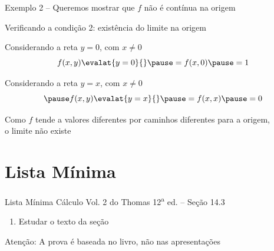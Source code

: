 \documentclass[fleqn,utf8,aspectratio=169,12pt,ignorenonframetext]{beamer}
\begin{document}
\begin{frame}{Exemplo \theexemplo}
  2 -- Queremos mostrar que $f$ não é contínua na origem

  \pause
  Verificando a condição 2: existência do limite na origem

  \pause
  Considerando a reta $y=0$, com $x\neq 0$
  \pause
  \[
    f(x, y)\evalat{y=0}{}
    \pause
    = f(x, 0)
    \pause
    = 1
  \]

  \pause
  Considerando a reta $y=x$, com $x\neq 0$
  \[
    \pause
    f(x, y)\evalat{y=x}{}
    \pause
    = f(x, x)
    \pause
    = 0
  \]

  \pause
  Como $f$ tende a valores diferentes por
  caminhos diferentes para a origem,\\
  o limite não existe
\end{frame}


\section{Lista Mínima}

\begin{frame}{Lista Mínima}
  Cálculo Vol. 2 do Thomas 12\textsuperscript{a} ed. -- Seção 14.3
  \begin{enumerate}
    \item Estudar o texto da seção
  \end{enumerate}

  \vfill
  Atenção: A prova é baseada no livro, não nas apresentações
\end{frame}

\end{document}
